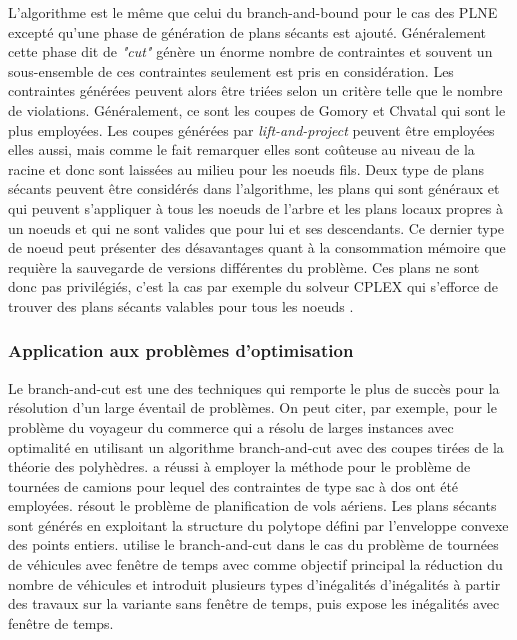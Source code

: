 \documentclass[12pt,a4paper,oneside]{book}
\theoremstyle{definition}
\begin{document}
		L'algorithme est le même que celui du branch-and-bound pour le cas des PLNE excepté qu'une phase de génération de plans sécants est ajouté. Généralement cette phase dit de \textit{"cut"} génère un énorme nombre de contraintes et souvent un sous-ensemble de ces contraintes seulement est pris en considération. Les contraintes générées peuvent alors être triées selon un critère telle que le nombre de violations. Généralement, ce sont les coupes de Gomory et Chvatal qui sont le plus employées. Les coupes générées par \textit{lift-and-project} peuvent être employées elles aussi, mais comme le fait remarquer \cite{mitchellbranch} elles sont coûteuse au niveau de la racine et donc sont laissées au milieu pour les noeuds fils. Deux type de plans sécants peuvent être considérés dans l'algorithme, les plans qui sont généraux et qui peuvent s'appliquer à tous les noeuds de l'arbre et les plans locaux propres à un noeuds et qui ne sont valides que pour lui et ses descendants. Ce dernier type de noeud peut présenter des désavantages quant à la consommation mémoire que requière la sauvegarde de versions différentes du problème. Ces plans ne sont donc pas privilégiés, c'est la cas par exemple du solveur CPLEX qui s'efforce de trouver des plans sécants valables pour tous les noeuds \cite{manual1987ibm}. 
		
		
		\subsubsection{Application aux problèmes d'optimisation}
		Le branch-and-cut est une des techniques qui remporte le plus de succès pour la résolution d'un large éventail de problèmes. On peut citer, par exemple, pour le problème du voyageur du commerce \cite{padberg1991branch} qui a résolu de larges instances avec optimalité en utilisant un algorithme branch-and-cut avec des coupes tirées de la théorie des polyhèdres.
		\cite{bixby1998solving} a réussi à employer la méthode pour le problème de tournées de camions pour lequel des contraintes de type sac à dos ont été employées. \cite{hoffman1993solving} résout le problème de planification de vols aériens. Les plans sécants sont générés en exploitant la structure du polytope défini par l'enveloppe convexe des points entiers. \cite{bard2002} utilise le branch-and-cut dans le cas du problème de tournées de véhicules avec fenêtre de temps avec comme objectif principal la réduction du nombre de véhicules et introduit plusieurs types d'inégalités d'inégalités à partir des travaux sur la variante sans fenêtre de temps, puis expose les inégalités avec fenêtre de temps.
		
\end{document}
